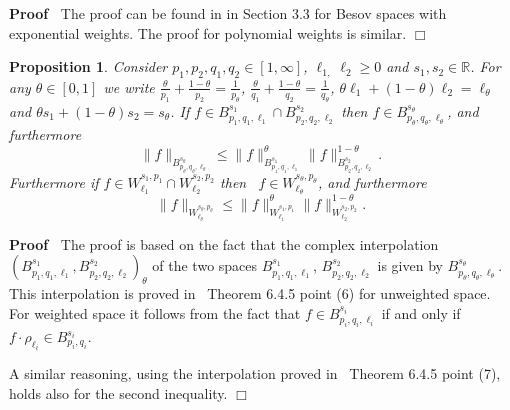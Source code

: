 \documentclass[a4paper,10pt]{article}
\newenvironment{proof}{\noindent\textbf{Proof\ }}{\hspace*{\fill}$\Box$\medskip}
\newtheorem{proposition}{Proposition}
{\theorembodyfont{\rmfamily}\newtheorem{remark}{Remark}}
\begin{document}
\begin{proof}
  The proof can be found in {\cite{MW17}} in Section 3.3 for Besov spaces with
  exponential weights. The proof for polynomial weights is similar.
\end{proof}

\begin{proposition}
  \label{proposition_interpolation}Consider $p_1, p_2, q_1, q_2 \in [1,
  \infty]$, $\ell_{1,} \ell_2 \geq 0$ and $s_1, s_2 \in \mathbb{R}$. For any
  $\theta \in [0, 1]$ we write $\frac{\theta}{p_1} + \frac{1 - \theta}{p_2} =
  \frac{1}{p_{\theta}}$, $\frac{\theta}{q_1} + \frac{1 - \theta}{q_2} =
  \frac{1}{q_{\theta}}$, $\theta \ell_1 + (1 - \theta) \ell_2 = \ell_{\theta}$
  and $\theta s_1 + (1 - \theta) s_2 = s_{\theta}$. If $f \in B^{s_1}_{p_1,
  q_1, \ell_1} \cap B^{s_2}_{p_2, q_2, \ell_2}$ then $f \in
  B^{s_{\theta}}_{p_{\theta}, q_{\theta}, \ell_{\theta}}$, and furthermore
  \[ \| f \|_{B^{s_{\theta}}_{p_{\theta}, q_{\theta}, \ell_{\theta}}} \leq \|
     f \|_{B^{s_1}_{p_1, q_1, \ell_1}}^{\theta} \| f \|_{B^{s_2}_{p_2, q_2,
     \ell_2}}^{1 - \theta} . \]
  Furthermore if $f \in W^{s_1, p_1}_{\ell_1} \cap W^{s_2, p_2}_{\ell_2}$ then
  \ $f \in W^{s_{\theta}, p_{\theta}}_{\ell_{\theta}}$, and furthermore
  \[ \| f \|_{W^{s_{\theta}, p_{\theta}}_{\ell_{\theta}}} \leq \| f
     \|_{W^{s_1, p_1}_{\ell_1}}^{\theta} \| f \|_{W^{s_2, p_2}_{\ell_2}}^{1 -
     \theta} . \]
\end{proposition}

\begin{proof}
  The proof is based on the fact that the complex interpolation
  $(B^{s_1}_{p_1, q_1, \ell_1}, B^{s_2}_{p_2, q_2, \ell_2})_{\theta}$ of the
  two spaces $B^{s_1}_{p_1, q_1, \ell_1}$, $B^{s_2}_{p_2, q_2, \ell_2}$ is
  given by $B^{s_{\theta}}_{p_{\theta}, q_{\theta}, \ell_{\theta}}$. This
  interpolation is proved in~{\cite{Joran1976}} Theorem 6.4.5 point (6) for
  unweighted space. For weighted space it follows from the fact that $f \in
  B^{s_i}_{p_i, q_i, \ell_i}$ if and only if $f \cdot \rho_{\ell_i} \in
  B^{s_i}_{p_i, q_i}$.
  
  A similar reasoning, using the interpolation proved in~{\cite{Joran1976}}
  Theorem 6.4.5 point (7), holds also for the second inequality. 
\end{proof}
\end{document}
